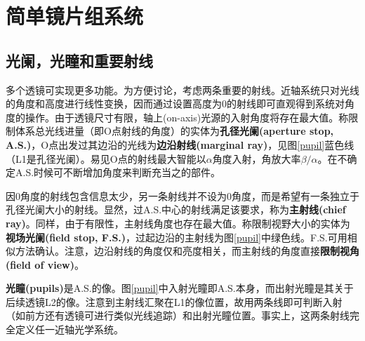 \documentclass[12pt]{ctexart}%
\begin{document}
\section*{简单镜片组系统}
\subsection*{光阑，光瞳和重要射线}
多个透镜可实现更多功能。为方便讨论，考虑两条重要的射线。近轴系统只对光线的角度和高度进行线性变换，因而通过设置高度为0的射线即可直观得到系统对角度的操作。由于透镜尺寸有限，轴上(on-axis)光源的入射角度将存在最大值。称限制体系总光线进量（即O点射线的角度）的实体为\textbf{孔径光阑(aperture stop, A.S.)}，O点出发过其边沿的光线为\textbf{边沿射线(marginal ray)}，见图\ref{pupil}蓝色线（L1是孔径光阑）。易见O点的射线最大智能以$\alpha$角度入射，角放大率$\beta/\alpha$。在不确定A.S.时候可不断增加角度来判断充当之的部件。
\par 因0角度的射线包含信息太少，另一条射线并不设为0角度，而是希望有一条独立于孔径光阑大小的射线。显然，过A.S.中心的射线满足该要求，称为\textbf{主射线(chief ray)}。同样，由于有限性，主射线角度也存在最大值。称限制视野大小的实体为\textbf{视场光阑(field stop, F.S.)}，过起边沿的主射线为图\ref{pupil}中绿色线。F.S.可用相似方法确认。注意，边沿射线的角度仅和亮度相关，而主射线的角度直接\textbf{限制视角(field of view)}。
\par \textbf{光瞳(pupils)}是A.S.的像。图\ref{pupil}中入射光瞳即A.S.本身，而出射光瞳是其关于后续透镜L2的像。注意到主射线汇聚在L1的像位置，故用两条线即可判断入射（如前方还有透镜可进行类似光线追踪）和出射光瞳位置。事实上，这两条射线完全定义任一近轴光学系统。
\end{document}
